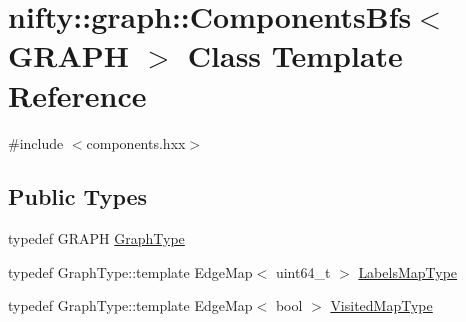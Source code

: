 \hypertarget{classnifty_1_1graph_1_1ComponentsBfs}{}\section{nifty\+:\+:graph\+:\+:Components\+Bfs$<$ G\+R\+A\+PH $>$ Class Template Reference}
\label{classnifty_1_1graph_1_1ComponentsBfs}


{\ttfamily \#include $<$components.\+hxx$>$}

\subsection*{Public Types}
\begin{DoxyCompactItemize}
\item 
typedef G\+R\+A\+PH \hyperlink{classnifty_1_1graph_1_1ComponentsBfs_a8122d3bba657eeae191a63ea83bfaba9}{Graph\+Type}
\item 
typedef Graph\+Type\+::template Edge\+Map$<$ uint64\+\_\+t $>$ \hyperlink{classnifty_1_1graph_1_1ComponentsBfs_a7fc482c4156bb2923986b1823491b6bf}{Labels\+Map\+Type}
\item 
typedef Graph\+Type\+::template Edge\+Map$<$ bool $>$ \hyperlink{classnifty_1_1graph_1_1ComponentsBfs_aea474b2e133f57c71193ba2fd24c7603}{Visited\+Map\+Type}
\end{DoxyCompactItemize}
